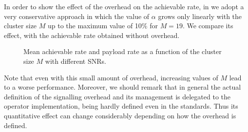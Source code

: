In order to show the effect of the overhead on the achievable rate, in  
we adopt a very conservative approach in which the value of $\alpha$ grows only linearly with the cluster size $M$ up to the maximum value of 10\% for $M=19$. We compare its effect, with the achievable rate obtained without overhead.
\begin{figure}[h]
\begin{center}
\begin{small}
\end{small}
\end{center}
\vspace*{-2.7mm}\caption{Mean achievable rate and payload rate as a function of the cluster size $M$ with different SNRs.}\label{rate2x2SNR15over}
\end{figure}
Note that even with this small amount of overhead, increasing values of $M$ lead to a worse performance. Moreover, we should remark that in general the actual definition of the signalling overhead and its management is delegated to the operator implementation, being hardly defined even in the standards. Thus its quantitative effect can change considerably depending on how the overhead is defined.


